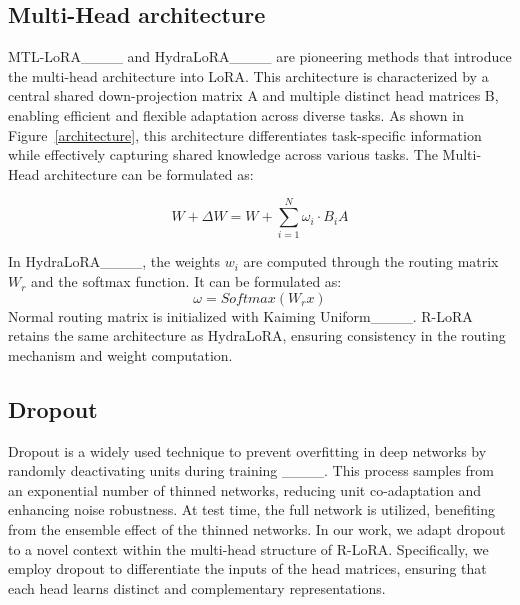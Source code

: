 \subsection{Multi-Head architecture}
\label{multi-head}
MTL-LoRA____ and HydraLoRA____ are pioneering methods that introduce the multi-head architecture into LoRA. This architecture is characterized by a central shared down-projection matrix A and multiple distinct head matrices B, enabling efficient and flexible adaptation across diverse tasks. 
As shown in Figure~\ref{architecture}, this architecture differentiates task-specific information while effectively capturing shared knowledge across various tasks. The Multi-Head architecture can be formulated as:

\begin{equation}
    W + \Delta W = W + \sum_{i=1}^{N} \omega_i \cdot B_i A
    \label{eq:multi-head}
\end{equation}

In HydraLoRA____, the weights $w_i$ are computed through the routing matrix $W_r$ and the softmax function. It can be formulated as:
\begin{equation}
    \omega = Softmax(W_{r} x)
    \label{eq:multi-head}
\end{equation}
Normal routing matrix is initialized with Kaiming Uniform____. R-LoRA retains the same architecture as HydraLoRA, ensuring consistency in the routing mechanism and weight computation.

\subsection{Dropout}
Dropout is a widely used technique to prevent overfitting in deep networks by randomly deactivating units during training ____. This process samples from an exponential number of thinned networks, reducing unit co-adaptation and enhancing noise robustness. At test time, the full network is utilized, benefiting from the ensemble effect of the thinned networks. In our work, we adapt dropout to a novel context within the multi-head structure of R-LoRA. Specifically, we employ dropout to differentiate the inputs of the head matrices, ensuring that each head learns distinct and complementary representations.